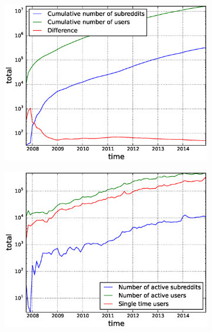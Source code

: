 \begin{figure}[!tb]
\centering
\begin{subfigure}{.49\textwidth}\includegraphics[scale=0.4]{./images/cumulative_users_subreddits.eps}\caption{}\end{subfigure}
\begin{subfigure}{.49\textwidth}\includegraphics[scale=0.4]{./images/active_users_subreddits.eps}\caption{}\end{subfigure}

\end{figure}
